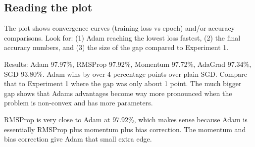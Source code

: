 \documentclass[11pt, letterpaper]{article}
\begin{document}
\subsection{Reading the plot}
The plot shows convergence curves (training loss vs epoch) and/or accuracy comparisons. Look for: (1) Adam reaching the lowest loss fastest, (2) the final accuracy numbers, and (3) the size of the gap compared to Experiment 1.

Results: Adam 97.97\%, RMSProp 97.92\%, Momentum 97.72\%, AdaGrad 97.34\%, SGD 93.80\%. Adam wins by over 4 percentage points over plain SGD. Compare that to Experiment 1 where the gap was only about 1 point. The much bigger gap shows that Adams advantages become way more pronounced when the problem is non-convex and has more parameters.

RMSProp is very close to Adam at 97.92\%, which makes sense because Adam is essentially RMSProp plus momentum plus bias correction. The momentum and bias correction give Adam that small extra edge.
\end{document}
